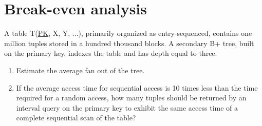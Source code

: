 \section{Break-even analysis}

A table T(\underline{PK}, X, Y, $\dots$), primarily organized as entry-sequenced, contains one million tuples stored in a hundred thousand blocks. 
A secondary B+ tree, built on the primary key, indexes the table and has depth equal to three.
\begin{enumerate}
    \item Estimate the average fan out of the tree.
    \item If the average access time for sequential access is 10 times less than the time required for a random access, how many tuples should be returned by an interval query on the primary key to exhibit the same access time of a complete sequential scan of the table?
\end{enumerate}

